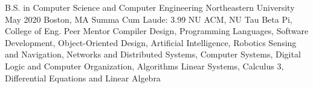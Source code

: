 

\begin{cveducation}
  \cvedu
    {B.S. in Computer Science and Computer Engineering} %
    {Northeastern University} %
    {May 2020} %
    {Boston, MA} %
    {Summa Cum Laude: 3.99} %
    { %
        NU ACM,
        NU Tau Beta Pi,
        College of Eng. Peer Mentor
    }
    { %
    	Compiler Design,
        Programming Languages, 
        Software Development, 
        Object-Oriented Design,
        Artificial Intelligence, 
        Robotics Sensing and Navigation, 
   	 	Networks and Distributed Systems,
        Computer Systems,
     	Digital Logic and Computer Organization,
     	Algorithms
    }
    { %
     	Linear Systems,
        Calculus 3,
     	Differential Equations and Linear Algebra
    }

\end{cveducation}
